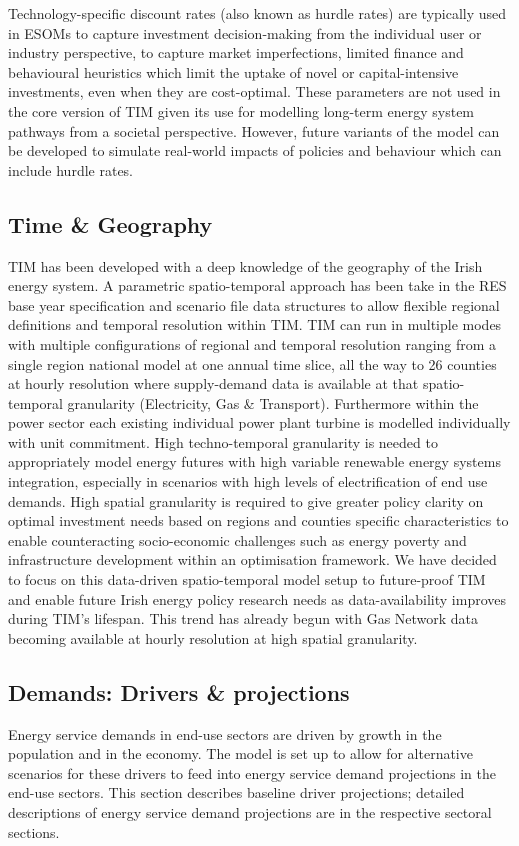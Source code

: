 \documentclass[journal abbreviation, manuscript]{copernicus}
\begin{document}
Technology-specific discount rates (also known as hurdle rates) are typically used in ESOMs to capture investment decision-making from the individual user or industry perspective, to capture market imperfections, limited finance and behavioural heuristics which limit the uptake of novel or capital-intensive investments, even when they are cost-optimal. These parameters are not used in the core version of TIM given its use for modelling long-term energy system pathways from a societal perspective. However, future variants of the model can be developed to simulate real-world impacts of policies and behaviour which can include hurdle rates. 

\subsection{Time \& Geography}
\label{ss:time_geo}
TIM has been developed with a deep knowledge of the geography of the Irish energy system. A parametric spatio-temporal approach has been take in the RES base year specification and scenario file data structures to allow flexible regional definitions and temporal resolution within TIM. TIM can run in multiple modes with multiple configurations of regional and temporal resolution ranging from a single region national model at one annual time slice, all the way to 26 counties at hourly resolution where supply-demand data is available at that spatio-temporal granularity (Electricity, Gas \& Transport). Furthermore within the power sector each existing individual power plant turbine is modelled individually with unit commitment. High techno-temporal granularity is needed to appropriately model energy futures with high variable renewable energy systems integration, especially in scenarios with high levels of electrification of end use demands. High spatial granularity is required to give greater policy clarity on optimal investment needs based on regions and counties specific characteristics to enable counteracting socio-economic challenges such as energy poverty and infrastructure development within an optimisation framework. We have decided to focus on this data-driven spatio-temporal model setup to future-proof TIM and enable future Irish energy policy research needs as data-availability improves during TIM's lifespan. This trend has already begun with Gas Network data becoming available at hourly resolution at high spatial granularity.

\subsection{Demands: Drivers \& projections}
\label{ss:model_proj}
Energy service demands in end-use sectors are driven by growth in the population and in the economy. The model is set up to allow for alternative scenarios for these drivers to feed into energy service demand projections in the end-use sectors. This section describes baseline driver projections; detailed descriptions of energy service demand projections are in the respective sectoral sections. 
\end{document}
